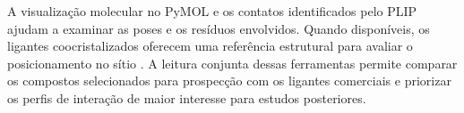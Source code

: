 A visualização molecular no PyMOL e os contatos identificados pelo PLIP ajudam a examinar as poses e os resíduos envolvidos. Quando disponíveis, os ligantes coocristalizados oferecem uma referência estrutural para avaliar o posicionamento no sítio \parencite{pymol,salentin2015plip,cole2005}. A leitura conjunta dessas ferramentas permite comparar os compostos selecionados para prospecção com os ligantes comerciais e priorizar os perfis de interação de maior interesse para estudos posteriores.
